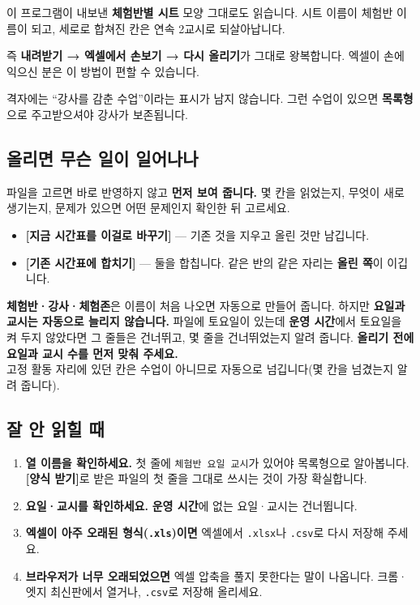 \documentclass[11pt,a4paper]{article}
\newcommand{\btn}[1]{\textcolor{ttdark}{\sffamily\bfseries[#1]}}   %
\newcommand{\tab}[1]{\textcolor{ttblue}{\sffamily\bfseries#1}}      %
\newcommand{\code}[1]{\texttt{\small #1}}
\begin{document}
이 프로그램이 내보낸 \textbf{체험반별 시트} 모양 그대로도 읽습니다.
시트 이름이 체험반 이름이 되고, 세로로 합쳐진 칸은 연속 2교시로 되살아납니다.

즉 \textbf{내려받기 → 엑셀에서 손보기 → 다시 올리기}가 그대로 왕복합니다.
엑셀이 손에 익으신 분은 이 방법이 편할 수 있습니다.

\begin{warn}
격자에는 ``강사를 감춘 수업''이라는 표시가 남지 않습니다.
그런 수업이 있으면 \textbf{목록형}으로 주고받으셔야 강사가 보존됩니다.
\end{warn}

\subsection{올리면 무슨 일이 일어나나}

파일을 고르면 바로 반영하지 않고 \textbf{먼저 보여 줍니다.} 몇 칸을 읽었는지, 무엇이 새로 생기는지,
문제가 있으면 어떤 문제인지 확인한 뒤 고르세요.

\begin{itemize}
  \item \btn{지금 시간표를 이걸로 바꾸기} — 기존 것을 지우고 올린 것만 남깁니다.
  \item \btn{기존 시간표에 합치기} — 둘을 합칩니다. 같은 반의 같은 자리는 \textbf{올린 쪽}이 이깁니다.
\end{itemize}

\begin{warn}
\textbf{체험반·강사·체험존}은 이름이 처음 나오면 자동으로 만들어 줍니다.
하지만 \textbf{요일과 교시는 자동으로 늘리지 않습니다.}
파일에 토요일이 있는데 \tab{운영 시간}에서 토요일을 켜 두지 않았다면 그 줄들은 건너뛰고,
몇 줄을 건너뛰었는지 알려 줍니다. \textbf{올리기 전에 요일과 교시 수를 먼저 맞춰 주세요.}\\[0.3em]
고정 활동 자리에 있던 칸은 수업이 아니므로 자동으로 넘깁니다(몇 칸을 넘겼는지 알려 줍니다).
\end{warn}

\subsection{잘 안 읽힐 때}

\begin{enumerate}
  \item \textbf{열 이름을 확인하세요.} 첫 줄에 \code{체험반 요일 교시}가 있어야 목록형으로 알아봅니다.
        \btn{양식 받기}로 받은 파일의 첫 줄을 그대로 쓰시는 것이 가장 확실합니다.
  \item \textbf{요일·교시를 확인하세요.} \tab{운영 시간}에 없는 요일·교시는 건너뜁니다.
  \item \textbf{엑셀이 아주 오래된 형식(\code{.xls})이면} 엑셀에서 \code{.xlsx}나 \code{.csv}로 다시 저장해 주세요.
  \item \textbf{브라우저가 너무 오래되었으면} 엑셀 압축을 풀지 못한다는 말이 나옵니다.
        크롬·엣지 최신판에서 열거나, \code{.csv}로 저장해 올리세요.
\end{enumerate}
\end{document}
